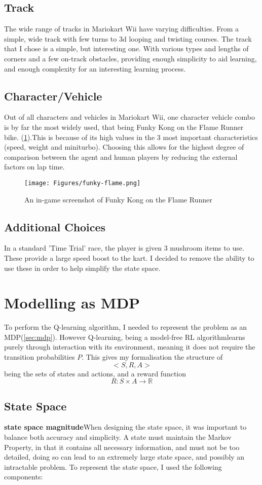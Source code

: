 \subsection{Track}
The wide range of tracks in Mariokart Wii have varying difficulties. From a simple, wide track with few turns to 3d looping and twisting courses. The track that I chose is a simple, but interesting one. With various types and lengths of corners and a few on-track obstacles, providing enough simplicity to aid learning, and enough complexity for an interesting learning process.
\subsection{Character/Vehicle}
Out of all characters and vehicles in Mariokart Wii, one character vehicle combo is by far the most widely used, that being Funky Kong on the Flame Runner bike. (\ref{fig:funky-flame}).This is because of its high values in the 3 most important characteristics (speed, weight and miniturbo). Choosing this allows for the highest degree of comparison between the agent and human players by reducing the external factors on lap time.
\begin{figure}[hb]
    \centering
    \texttt{[image: Figures/funky-flame.png]}
    \caption{An in-game screenshot of Funky Kong on the Flame Runner}
    \label{fig:funky-flame}
\end{figure}
\subsection{Additional Choices}
In a standard 'Time Trial' race, the player is given 3 mushroom items to use. These provide a large speed boost to the kart. I decided to remove the ability to use these in order to help simplify the state space.
\section{Modelling as MDP}
To perform the Q-learning algorithm, I needed to represent the problem as an MDP(\ref{sec:mdp}). However Q-learning, being a model-free RL algorithmlearns purely through interaction with its environment, meaning it does not require the transition probabilities $P$. This gives my formalisation the structure of $$<S, R, A>$$ being the sets of states and actions, and a reward function
$$R : S \times A \rightarrow \mathbb{R} $$
\subsection{State Space}
\textbf{state space magnitude}When designing the state space, it was important to balance both accuracy and simplicity. A state must maintain the Markov Property, in that it contains all necessary information, and must not be too detailed, doing so can lead to an extremely large state space, and possibly an intractable problem. To represent the state space, I used the following components:
